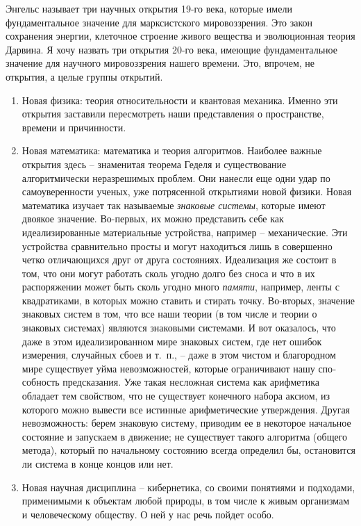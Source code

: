 \documentclass{book}
\begin{document}
Энгельс называет три научных открытия 19-го века, которые имели фундаментальное значение для марксистского мировоззрения. Это закон сохранения энергии, клеточное строение живого вещества и эволюционная теория Дарвина. Я хочу назвать три открытия 20-го века, имеющие фундаментальное значение для научного мировоззрения нашего времени. Это, впрочем, не открытия, а целые группы открытий.
\begin{enumerate}
 \item Новая физика: теория относительности и квантовая механика. Именно эти открытия заставили пересмотреть наши представления о пространстве, времени и причинности.
 \item Новая математика: математика и теория алгоритмов. Наиболее важные открытия здесь -- знаменитая теорема Геделя и существование алгоритмически неразрешимых проблем. Они нанесли еще одни удар по самоуверенности ученых, уже потрясенной открытиями новой физики. Новая математика изучает так называемые \textit{знаковые системы},  которые имеют двоякое значение. Во-первых, их можно представить себе как идеализированные материальные устройства, например -- механи­ческие. Эти устройства сравнительно просты и могут находить­ся лишь в совершенно четко отличающихся друг от друга состояниях. Идеализация же состоит в том, что они могут работать сколь угодно долго без сноса и что в их распоряжении может быть сколь угодно много \textit{памяти},  например, ленты с квадрати­ками, в которых можно ставить и стирать точку. Во-вторых, значение знаковых систем в том, что все наши теории (в том числе и теории о знаковых системах) являются знаковыми системами. И вот оказалось, что даже в этом идеализированном мире знаковых систем, где нет 
ошибок измерения, случайных сбоев и т.~п., -- даже в этом чистом и благородном мире сущест­вует уйма невозможностей, которые ограничивают нашу спо­собность предсказания. Уже такая несложная система как ариф­метика обладает тем свойством, что не существует конечного набора аксиом, из которого можно вывести все истинные арифметические утверждения. Другая невозможность: берем знако­вую систему, приводим ее в некоторое начальное состояние и запускаем в движение; не существует такого алгоритма (об­щего метода), который по начальному состоянию всегда опре­делил бы, остановится ли система в конце концов или нет.
 \item Новая научная дисциплина -- кибернетика, со своими поня­тиями и подходами, применимыми к объектам любой природы, в том числе к живым организмам и человеческому обществу. О ней у нас речь пойдет особо.
\end{enumerate}
\end{document}
